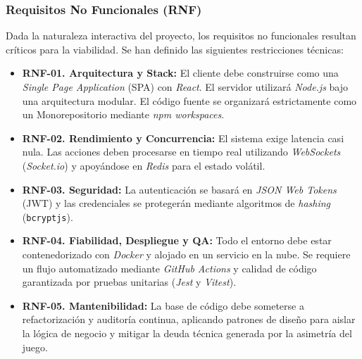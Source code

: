 \subsubsection{Requisitos No Funcionales (RNF)}
Dada la naturaleza interactiva del proyecto, los requisitos no funcionales resultan críticos para la viabilidad. Se han definido las siguientes restricciones técnicas:
\begin{itemize}
    \item \textbf{RNF-01. Arquitectura y Stack:} El cliente debe construirse como una \textit{Single Page Application} (SPA) con \textit{React}. El servidor utilizará \textit{Node.js} bajo una arquitectura modular. El código fuente se organizará estrictamente como un Monorepositorio mediante \textit{npm workspaces}.
    \item \textbf{RNF-02. Rendimiento y Concurrencia:} El sistema exige latencia casi nula. Las acciones deben procesarse en tiempo real utilizando \textit{WebSockets} (\textit{Socket.io}) y apoyándose en \textit{Redis} para el estado volátil. 
    \item \textbf{RNF-03. Seguridad:} La autenticación se basará en \textit{JSON Web Tokens} (JWT) y las credenciales se protegerán mediante algoritmos de \textit{hashing} (\texttt{bcryptjs}).
    \item \textbf{RNF-04. Fiabilidad, Despliegue y QA:} Todo el entorno debe estar contenedorizado con \textit{Docker} y alojado en un servicio en la nube. Se requiere un flujo automatizado mediante \textit{GitHub Actions} y calidad de código garantizada por pruebas unitarias (\textit{Jest} y \textit{Vitest}).
    \item \textbf{RNF-05. Mantenibilidad:} La base de código debe someterse a refactorización y auditoría continua, aplicando patrones de diseño para aislar la lógica de negocio y mitigar la deuda técnica generada por la asimetría del juego.
\end{itemize}

